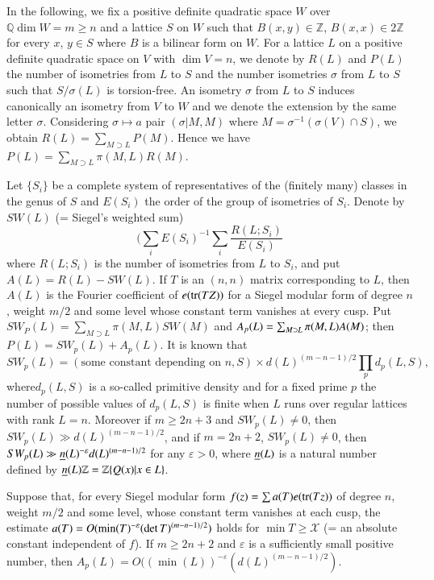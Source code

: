 In the following, we fix a positive definite quadratic space $W$ over
$\mathbb{Q}\dim W=m\geq n$ and a lattice $S$ on $W$ such that
$B(x,y)\in\mathbb{Z}$, $B(x,x)\in 2\mathbb{Z}$ for every $x$, $y\in S$
where $B$ is a bilinear form on $W$. For a lattice $L$ on a positive
definite quadratic space on $V$ with $\dim V=n$, we denote by $R(L)$
and $P(L)$ the number of isometries from $L$ to $S$ and the number
isometries $\sigma$ from $L$ to $S$ such that $S/\sigma(L)$ is
torsion-free. An isometry $\sigma$ from $L$ to $S$ induces canonically
an isometry from $V$ to $W$ and we denote the extension by the same
letter $\sigma$. Considering $\sigma\mapsto a$ pair $(\sigma|M,M)$
where $M=\sigma^{-1}(\sigma(V)\cap S)$, we obtain
$R(L)=\sum\limits_{M\supset L}P(M)$. Hence we have
$P(L)=\sum\limits_{M\supset L}\pi(M,L)R(M)$.

Let $\{S_{i}\}$ be a complete system of representatives of the
(finitely many) classes in the genus of $S$ and $E(S_{i})$ the order
of the group of isometries of $S_{i}$. Denote by $SW(L)$ (= Siegel's
weighted sum)
$$
(\sum_{i}E(S_{i})^{-1}\sum_{i}\frac{R(L;S_{i})}{E(S_{i})}
$$
where $R(L;S_{i})$ is the number of isometries from $L$ to $S_{i}$,
and put $A(L)=R(L)-SW(L)$. If $T$ is an $(n,n)$ matrix corresponding
to $L$, then $A(L)$ is the Fourier coefficient of $e(\operatorname{tr}(TZ))$ for a
Siegel modular form of degree $n$, weight $m/2$ and some level whose
constant term vanishes at every cusp. Put
$SW_{P}(L)=\sum\limits_{M\supset L}\pi(M,L)SW(M)$ and
$A_{p}(L)=\sum_{M\supset L}\pi(M,L)\break A(M)$; then
$P(L)=SW_{p}(L)+A_{p}(L)$. It is known that
{\fontsize{10}{12}\selectfont
$$
SW_{p}(L)=(\text{some constant depending on } n,S)\times
d(L)^{(m-n-1)/2}\prod_{p}d_{p}(L,S), 
$$}
where\pageoriginale $d_{p}(L,S)$ is a so-called primitive density and
for a fixed prime $p$ the number of possible values of $d_{p}(L,S)$ is
finite when $L$ runs over regular lattices with rank $L=n$. Moreover
if $m\geq 2n+3$ and $SW_{p}(L)\neq 0$, then $SW_{p}(L)\gg
d(L)^{(m-n-1)/2}$, and if $m=2n+2$, $SW_{p}(L)\neq 0$, then
$SW_{p}(L)\gg \underline{n}(L)^{-\varepsilon}d(L)^{(m-n-1)/2}$ for any
$\varepsilon>0$, where $\underline{n}(L)$ is a natural number defined by
$\underline{n}(L)\mathbb{Z}=\mathbb{Z}\{Q(x)|x\in L\}$.

\begin{subtheorem}\label{c1:thm-1.7.3}
Suppose that, for every Siegel modular form $f(z)=\sum a(T)e(\operatorname{tr}(Tz))$
of degree $n$, weight $m/2$ and some level, whose constant term
vanishes at each cusp, the estimate $a(T)=O(\min(T)^{-\varepsilon}\break(\det
T)^{(m-n-1)/2})$ holds for $\min T\geq \mathscr{X}$ (= an absolute
constant independent of $f$). If $m\geq 2n+2$ and $\varepsilon$ is a
sufficiently small positive number, then
$A_{p}(L)=O((\min(L))^{-\varepsilon}(d(L)^{(m-n-1)/2})$. 
\end{subtheorem}

